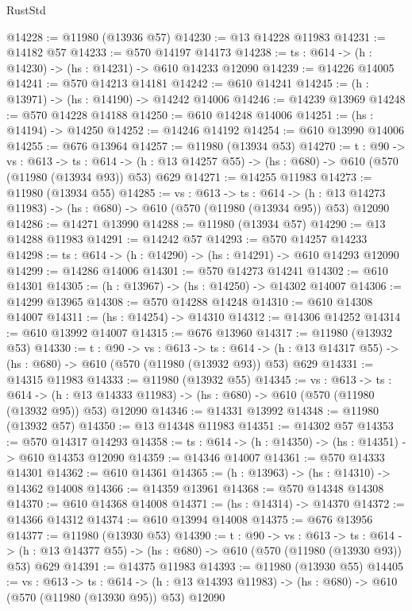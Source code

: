 \begin{lexlean}{RustStd}
\begin{coremodule}
@14228 := @11980 (@13936 @57)
@14230 := @13 @14228 @11983
@14231 := @14182 @57
@14233 := @570 @14197 @14173
@14238 := {ts : @614} -> (h : @14230) -> (hs : @14231) -> @610 @14233 @12090
@14239 := @14226 @14005
@14241 := @570 @14213 @14181
@14242 := @610 @14241
@14245 := (h : @13971) -> (hs : @14190) -> @14242 @14006
@14246 := @14239 @13969
@14248 := @570 @14228 @14188
@14250 := @610 @14248 @14006
@14251 := (hs : @14194) -> @14250
@14252 := @14246 @14192
@14254 := @610 @13990 @14006
@14255 := @676 @13964
@14257 := @11980 (@13934 @53)
@14270 := {t : @90} ->
  {vs : @613} ->
  {ts : @614} -> (h : @13 @14257 @55) -> (hs : @680) -> @610 (@570 (@11980 (@13934 @93)) @53) @629
@14271 := @14255 @11983
@14273 := @11980 (@13934 @55)
@14285 := {vs : @613} ->
  {ts : @614} ->
  (h : @13 @14273 @11983) -> (hs : @680) -> @610 (@570 (@11980 (@13934 @95)) @53) @12090
@14286 := @14271 @13990
@14288 := @11980 (@13934 @57)
@14290 := @13 @14288 @11983
@14291 := @14242 @57
@14293 := @570 @14257 @14233
@14298 := {ts : @614} -> (h : @14290) -> (hs : @14291) -> @610 @14293 @12090
@14299 := @14286 @14006
@14301 := @570 @14273 @14241
@14302 := @610 @14301
@14305 := (h : @13967) -> (hs : @14250) -> @14302 @14007
@14306 := @14299 @13965
@14308 := @570 @14288 @14248
@14310 := @610 @14308 @14007
@14311 := (hs : @14254) -> @14310
@14312 := @14306 @14252
@14314 := @610 @13992 @14007
@14315 := @676 @13960
@14317 := @11980 (@13932 @53)
@14330 := {t : @90} ->
  {vs : @613} ->
  {ts : @614} -> (h : @13 @14317 @55) -> (hs : @680) -> @610 (@570 (@11980 (@13932 @93)) @53) @629
@14331 := @14315 @11983
@14333 := @11980 (@13932 @55)
@14345 := {vs : @613} ->
  {ts : @614} ->
  (h : @13 @14333 @11983) -> (hs : @680) -> @610 (@570 (@11980 (@13932 @95)) @53) @12090
@14346 := @14331 @13992
@14348 := @11980 (@13932 @57)
@14350 := @13 @14348 @11983
@14351 := @14302 @57
@14353 := @570 @14317 @14293
@14358 := {ts : @614} -> (h : @14350) -> (hs : @14351) -> @610 @14353 @12090
@14359 := @14346 @14007
@14361 := @570 @14333 @14301
@14362 := @610 @14361
@14365 := (h : @13963) -> (hs : @14310) -> @14362 @14008
@14366 := @14359 @13961
@14368 := @570 @14348 @14308
@14370 := @610 @14368 @14008
@14371 := (hs : @14314) -> @14370
@14372 := @14366 @14312
@14374 := @610 @13994 @14008
@14375 := @676 @13956
@14377 := @11980 (@13930 @53)
@14390 := {t : @90} ->
  {vs : @613} ->
  {ts : @614} -> (h : @13 @14377 @55) -> (hs : @680) -> @610 (@570 (@11980 (@13930 @93)) @53) @629
@14391 := @14375 @11983
@14393 := @11980 (@13930 @55)
@14405 := {vs : @613} ->
  {ts : @614} ->
  (h : @13 @14393 @11983) -> (hs : @680) -> @610 (@570 (@11980 (@13930 @95)) @53) @12090

\end{coremodule}
\end{lexlean}
